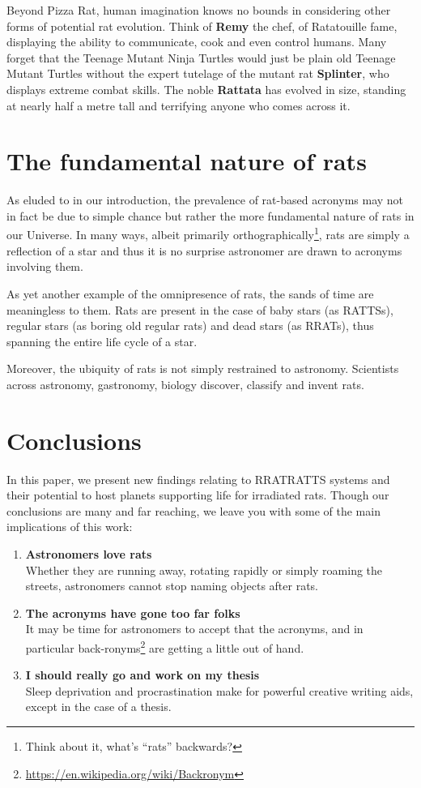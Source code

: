 \documentclass[twocolumn, twocolappendix]{aastex631}
\newcommand{\tauriRAT}{RATTS\xspace}
\newcommand{\radioRAT}{RRAT\xspace}
\newcommand{\binaryRAT}{RRATRATTS\xspace}
\begin{document}
Beyond Pizza Rat, human imagination knows no bounds in considering other forms of potential rat evolution. Think of \textbf{Remy} the chef, of Ratatouille fame, displaying the ability to communicate, cook and even control humans. Many forget that the Teenage Mutant Ninja Turtles would just be plain old Teenage Mutant Turtles without the expert tutelage of the mutant rat \textbf{Splinter}, who displays extreme combat skills. The noble \textbf{Rattata} has evolved in size, standing at nearly half a metre tall \citep{pokemon} and terrifying anyone who comes across it. 

\section{The fundamental nature of rats}\label{sec:fundamental_rats}

As eluded to in our introduction, the prevalence of rat-based acronyms may not in fact be due to simple chance but rather the more fundamental nature of rats in our Universe. In many ways, albeit primarily orthographically\footnote{Think about it, what's ``rats'' backwards?}, rats are simply a reflection of a star and thus it is no surprise astronomer are drawn to acronyms involving them.

As yet another example of the omnipresence of rats, the sands of time are meaningless to them. Rats are present in the case of baby stars (as \tauriRAT{}s), regular stars (as boring old regular rats) and dead stars (as \radioRAT{}s), thus spanning the entire life cycle of a star.

Moreover, the ubiquity of rats is not simply restrained to astronomy. Scientists across astronomy, gastronomy, biology discover, classify and invent rats.


\section{Conclusions}%
In this paper, we present new findings relating to \binaryRAT systems and their potential to host planets supporting life for irradiated rats. Though our conclusions are many and far reaching, we leave you with some of the main implications of this work:
\begin{enumerate}
    \item \textbf{Astronomers love rats}\\Whether they are running away, rotating rapidly or simply roaming the streets, astronomers cannot stop naming objects after rats.
    \item \textbf{The acronyms have gone too far folks}\\It may be time for astronomers to accept that the acronyms, and in particular back-ronyms\footnote{\url{https://en.wikipedia.org/wiki/Backronym}} are getting a little out of hand.
    \item \textbf{I should really go and work on my thesis}\\Sleep deprivation and procrastination make for powerful creative writing aids, except in the case of a thesis.
\end{enumerate}
\end{document}
